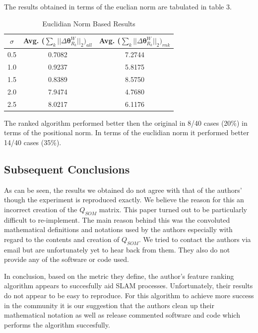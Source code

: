 \documentclass[10pt,twocolumn,letterpaper]{article}
\begin{document}
The results obtained in terms of the euclian norm are tabulated in table 3. 

\begin{table}[t]
\begin{center}
\begin{tabular}{|c|c|c|}
\hline
$\sigma$ & Avg. ($ \sum_k || \Delta \boldsymbol{\theta}_{R_k}^W ||_2)_{all} $ & Avg. ($ \sum_k || \Delta \boldsymbol{\theta}_{R_k}^W ||_2)_{rnk} $  \\
\hline
0.5  & 0.7082  &  7.2744 \\
\hline
1.0  &  0.9237 &  5.8175 \\
\hline
1.5  &  0.8389 &  8.5750 \\
\hline
2.0  &  7.9474 &  4.7680 \\
\hline
2.5  &  8.0217 &  6.1176 \\
\hline
\end{tabular}
\end{center}
\caption{Euclidian Norm Based Results}
\end{table}

The ranked algorithm performed better then the original in 8/40 cases (20\%) in terms of the positional norm. In terms of the euclidian norm it performed better 14/40 cases (35\%). 

\subsection{Subsequent Conclusions}

As can be seen, the results we obtained do not agree with that of the authors' though the experiment is reproduced exactly. We believe the reason for this an incorrect creation of the $Q_{SOM}$ matrix. This paper turned out to be particularly difficult to re-implement. The main reason behind this was the convoluted mathematical definitions and notations used by the authors especially with regard to the contents and creation of $Q_{SOM}$. We tried to contact the authors via email but are unfortunately yet to hear back from them. They also do not provide any of the software or code used.

In conclusion, based on the metric they define, the author's feature ranking algorithm appears to succesfully aid SLAM processes. Unfortunately, their results do not appear to be easy to reproduce. For this algorithm to achieve more success in the community it is our suggestion that the authors clean up their mathematical notation as well as release commented software and code which performs the algorithm succesfully.    
\end{document}
